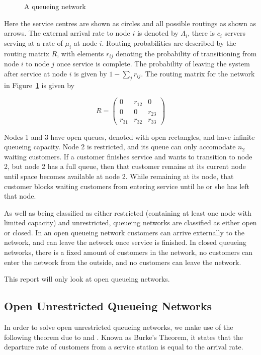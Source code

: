 \documentclass{article}
\begin{document}
\begin{figure}[H]
    
    \caption{A queueing network}
    \label{fig:QnetNotation}
\end{figure}

Here the service centres are shown as circles and all possible routings as shown as arrows.
The external arrival rate to node $i$ is denoted by $\Lambda_i$, there is $c_i$ servers serving at a rate of $\mu_i$ at node $i$.
Routing probabilities are described by the routing matrix $R$, with elements $r_{ij}$ denoting the probability of transitioning from node $i$ to node $j$ once service is complete.
The probability of leaving the system after service at node $i$ is given by $1 - \sum_j r_{ij}$.
The routing matrix for the network in Figure~\ref{fig:QnetNotation} is given by

\begin{equation*}
R = \left(
\begin{matrix}
  0 & r_{12} & 0 \\
  0 & 0 & r_{23} \\
  r_{31} & r_{32} & r_{33}
 \end{matrix}
 \right)
\end{equation*}

Nodes 1 and 3 have open queues, denoted with open rectangles, and have infinite queueing capacity.
Node 2 is restricted, and its queue can only accomodate $n_2$ waiting customers.
If a customer finishes service and wants to transition to node 2, but node 2 has a full queue, then that customer remains at its current node until space becomes available at node 2.
While remaining at its node, that customer blocks waiting customers from entering service until he or she has left that node.

As well as being classified as either restricted (containing at least one node with limited capacity) and unrestricted, queueing networks are classified as either open or closed.
In an open queueing network customers can arrive externally to the network, and can leave the network once service is finished.
In closed queueing networks, there is a fixed amount of customers in the network, no customers can enter the network from the outside, and no customers can leave the network.

This report will only look at open queueing networks.


\subsection{Open Unrestricted Queueing Networks}
In order to solve open unrestricted queueing networks, we make use of the following theorem due to \cite{burke56} and \cite{reich57}.
Known as Burke's Theorem, it states that the departure rate of customers from a service station is equal to the arrival rate.
\end{document}
